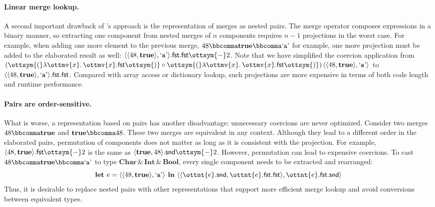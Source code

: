 \paragraph{Linear merge lookup.}
A second important drawback of \citeauthor{dunfield2014elaborating}'s approach
is the representation of merges as nested pairs. The merge operator composes
expressions in a binary manner, so extracting one component from nested merges
of $n$ components requires $n-1$ projections in the worst case. For example,
when adding one more element to the previous merge, $48  \bbcomma   \mathbf{true}   \bbcomma   \text{`\texttt{a}'} $ for
example, one more projection must be added to the elaborated result as well:
$   \langle   \langle  48 ,   \mathbf{true}   \rangle  ,   \text{`\texttt{a}'}   \rangle   . \mathsf{fst}   . \mathsf{fst}   \ottsym{-}  2$. Note that we have simplified the coercion
application from $(\ottsym{(}    \lambda \ottmv{x} .\, \ottmv{x}   . \mathsf{fst}   \ottsym{)}\circ\ottsym{(}    \lambda \ottmv{x} .\, \ottmv{x}   . \mathsf{fst}   \ottsym{)})\, \langle   \langle  48 ,   \mathbf{true}   \rangle  ,   \text{`\texttt{a}'}   \rangle $ to
$   \langle   \langle  48 ,   \mathbf{true}   \rangle  ,   \text{`\texttt{a}'}   \rangle   . \mathsf{fst}   . \mathsf{fst} $. Compared with array access or dictionary lookup,
such projections are more expensive in terms of both code length and runtime
performance.

\paragraph{Pairs are order-sensitive.}
What is worse, a representation based on pairs has another disadvantage:
unnecessary coercions are never optimized. Consider two merges $48  \bbcomma   \mathbf{true} $
and $ \mathbf{true}   \bbcomma  48$. These two merges are equivalent in any context. Although
they lead to a different order in the elaborated pairs, permutation of
components does not matter as long as it is consistent with the projection. For
example, $  \langle  48 ,   \mathbf{true}   \rangle   . \mathsf{fst}   \ottsym{-}  2$ is the same as $  \langle   \mathbf{true}  ,  48  \rangle   . \mathsf{snd}   \ottsym{-}  2$. However,
permutation can lead to expensive coercions. To cast $48  \bbcomma   \mathbf{true}   \bbcomma   \text{`\texttt{a}'} $ to type
$ \mathbf{Char}   \, {\&} \,   \mathbf{Int}   \, {\&} \,   \mathbf{Bool} $, every single component needs to be extracted and
rearranged:
\[
\textbf{let } e =  \langle   \langle  48 ,   \mathbf{true}   \rangle  ,   \text{`\texttt{a}'}   \rangle  \textbf{ in }
 \langle   \langle   \ottnt{e}  . \mathsf{snd}  ,    \ottnt{e}  . \mathsf{fst}   . \mathsf{fst}   \rangle  ,    \ottnt{e}  . \mathsf{fst}   . \mathsf{snd}   \rangle 
\]
Thus, it is desirable to replace nested pairs with other representations that
support more efficient merge lookup and avoid conversions between equivalent
types.

